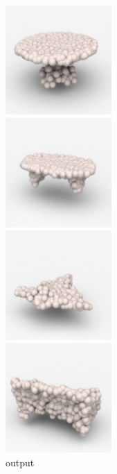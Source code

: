 \documentclass[14pt]{beamer}
\begin{document}
\begin{frame}
\begin{figure}
\begin{subfigure}[t]{0.18\textwidth}
        \includegraphics[scale=0.39]{qual_rgb_output}\\
        {\footnotesize output}
      \end{subfigure}
      \begin{subfigure}[t]{0.18\textwidth}
        \centering

\end{subfigure}
\end{figure}
\end{frame}
\end{document}
